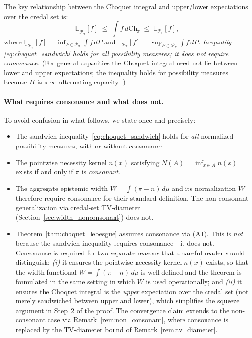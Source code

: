 \documentclass[12pt]{article}
\newcommand{\Ppi}{\mathcal{P}_\pi}
\newcommand{\E}{\mathbb{E}}
\begin{document}
The key relationship between the Choquet integral and upper/lower expectations
over the credal set is:
\begin{equation}
\underline{\E}_{\Ppi}[f]
\;\le\; \int f\,d\mathrm{Ch}_\pi
\;\le\; \overline{\E}_{\Ppi}[f],
\label{eq:choquet_sandwich}
\end{equation}
where $\underline{\E}_{\Ppi}[f]=\inf_{P\in\Ppi}\int f\,dP$ and
$\overline{\E}_{\Ppi}[f]=\sup_{P\in\Ppi}\int f\,dP$.
\emph{Inequality \eqref{eq:choquet_sandwich} holds for all possibility measures;
it does not require consonance.}
(For general capacities the Choquet integral need not lie between lower and
upper expectations; the inequality holds for possibility measures because
$\Pi$ is a $\infty$-alternating capacity \cite{grabisch2016}.)

\paragraph{What requires consonance and what does not.}
To avoid confusion in what follows, we state once and precisely:
\begin{itemize}
\item The sandwich inequality~\eqref{eq:choquet_sandwich} holds for \emph{all}
  normalized possibility measures, with or without consonance.
\item The pointwise necessity kernel $n(x)$ satisfying $N(A)=\inf_{x\in A}n(x)$
  exists if and only if $\pi$ is \emph{consonant}.
\item The aggregate epistemic width $W=\int(\pi-n)\,d\mu$ and its normalization
  $\overline{W}$ therefore require consonance for their standard definition.
  The non-consonant generalization via credal-set TV-diameter (Section~\ref{sec:width_nonconsonant})
  does not.
\item Theorem~\ref{thm:choquet_lebesgue} assumes consonance via (A1).
  This is \emph{not} because the sandwich inequality requires consonance---it
  does not.
  Consonance is required for two separate reasons that a careful reader should
  distinguish: \emph{(i)} it ensures the pointwise necessity kernel $n(x)$
  exists, so that the width functional $W=\int(\pi-n)\,d\mu$ is well-defined
  and the theorem is formulated in the same setting in which $W$ is used
  operationally; and \emph{(ii)} it ensures the Choquet integral is the
  \emph{upper} expectation over the credal set (not merely sandwiched between
  upper and lower), which simplifies the squeeze argument in Step~2 of the
  proof.
  The convergence claim extends to the non-consonant case via
  Remark~\ref{rem:non_consonant}, where consonance is replaced by the
  TV-diameter bound of Remark~\ref{rem:tv_diameter}.
\end{itemize}
\end{document}
